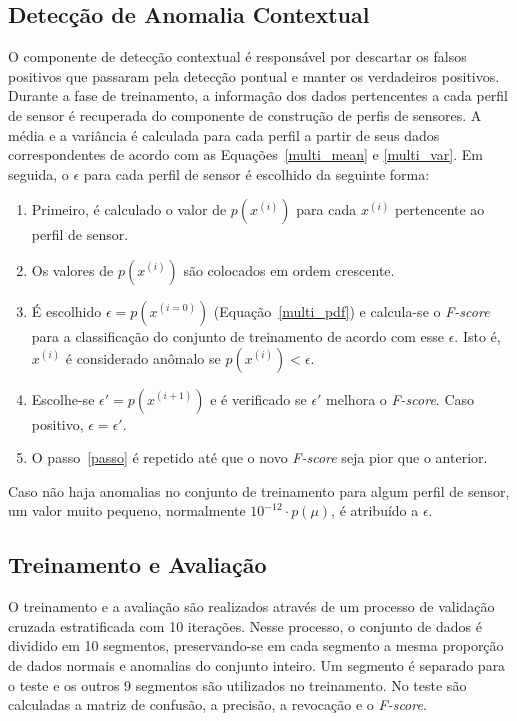 \documentclass[cic,tc]{iiufrgs}
\begin{document}
\subsection{Detecção de Anomalia Contextual}
\label{sistema_contxt}
O componente de detecção contextual é responsável por descartar os falsos positivos que passaram pela detecção pontual e manter os verdadeiros positivos. Durante a fase de treinamento, a informação dos dados pertencentes a cada perfil de sensor é recuperada do componente de construção de perfis de sensores. A média e a variância é calculada para cada perfil a partir de seus dados correspondentes de acordo com as Equações~\ref{multi_mean} e \ref{multi_var}. Em seguida, o $\epsilon$ para cada perfil de sensor é escolhido da seguinte forma:

\begin{enumerate}
     \item Primeiro, é calculado o valor de $p(x^{(i)})$ para cada $x^{(i)}$ pertencente ao perfil de sensor.
     \item Os valores de $p(x^{(i)})$ são colocados em ordem crescente.
     \item É escolhido $\epsilon = p(x^{(i=0)})$ (Equação~\ref{multi_pdf}) e calcula-se o \textit{F-score} para a classificação do conjunto de treinamento de acordo com esse $\epsilon$. Isto é, $x^{(i)}$ é considerado anômalo se $p(x^{(i)}) < \epsilon$.
     \item \label{passo} Escolhe-se $\epsilon' = p(x^{(i+1)})$ e é verificado se $\epsilon'$ melhora o \textit{F-score}. Caso positivo, $\epsilon = \epsilon'$.
     \item O passo~\ref{passo} é repetido até que o novo \textit{F-score} seja pior que o anterior.
     
\end{enumerate}

Caso não haja anomalias no conjunto de treinamento para algum perfil de sensor, um valor muito pequeno, normalmente $10^{-12}\cdot p(\mu)$, é atribuído a $\epsilon$. 

\subsection{Treinamento e Avaliação}
O treinamento e a avaliação são realizados através de um processo de validação cruzada estratificada com 10 iterações. Nesse processo, o conjunto de dados é dividido em 10 segmentos, preservando-se em cada segmento a mesma proporção de dados normais e anomalias do conjunto inteiro. Um segmento é separado para o teste e os outros 9 segmentos são utilizados no treinamento. No teste são calculadas a matriz de confusão, a precisão, a revocação e o \textit{F-score}.
\end{document}
